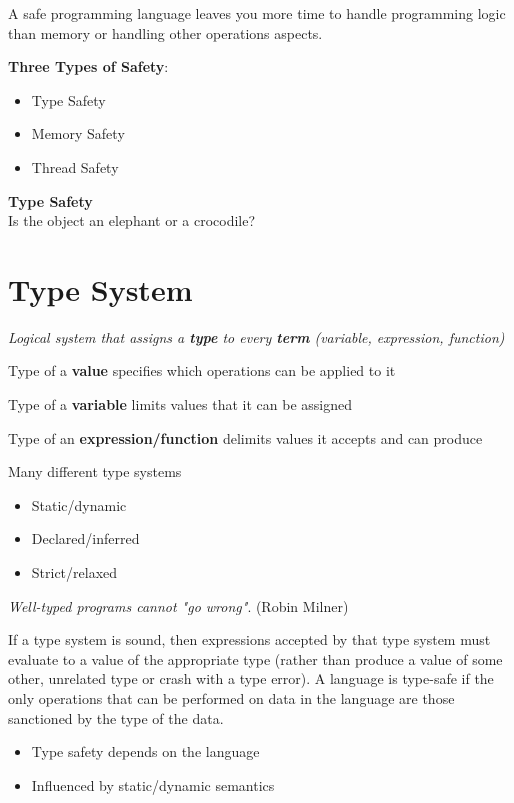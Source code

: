 \documentclass[11pt]{article}
\begin{document}
A safe programming language leaves you more time to handle programming logic than memory or handling other operations aspects. 

\textbf{Three Types of Safety}:

\begin{itemize}
	\item Type Safety
	\item Memory Safety
	\item Thread Safety
\end{itemize}

\newpage
\begin{center}
  {\LARGE \textbf{Type Safety}} \\
  Is the object an elephant or a crocodile?
\end{center}

\vspace{0.5cm}

\section*{Type System}

\textit{Logical system that assigns a \textbf{type} to every \textbf{term} (variable, expression, function)}

Type of a \textbf{value} specifies which operations can be applied to it

Type of a \textbf{variable} limits values that it can be assigned

Type of an \textbf{expression/function} delimits values it accepts and can produce

Many different type systems
\begin{itemize}
	\item Static/dynamic
	\item Declared/inferred
	\item Strict/relaxed
\end{itemize}

\textit{Well-typed programs cannot "go wrong"}. (Robin Milner)

If a type system is sound, then expressions accepted by that type system must evaluate to a value of the appropriate type (rather than produce a value of some other, unrelated type or crash with a type error). A language is type-safe if the only operations that can be performed on data in the language are those sanctioned by the type of the data.

\begin{itemize}
	\item Type safety depends on the language
	\item Influenced by static/dynamic semantics
\end{itemize}
\end{document}
